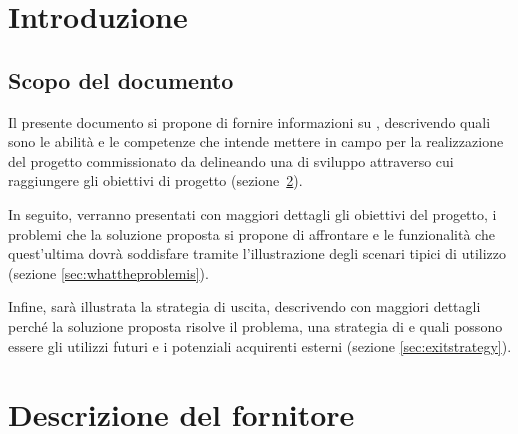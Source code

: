 \newcommand{\sharedPath}{../shared}
\newcommand{\doctitle}{Business Plan}








\section{Introduzione}

\subsection{Scopo del documento}
Il presente documento si propone di fornire informazioni su \team, descrivendo quali sono le abilità e le competenze che intende mettere in campo per la realizzazione del progetto commissionato da \customer delineando una  di sviluppo attraverso cui raggiungere gli obiettivi di progetto (sezione~\ref{sec:whoweare}).

 In seguito, verranno presentati con maggiori dettagli gli obiettivi del progetto, i problemi che la soluzione proposta si propone di affrontare e le funzionalità che quest'ultima dovrà soddisfare tramite l'illustrazione degli scenari tipici di utilizzo (sezione \ref{sec:whattheproblemis}).
 
Infine, sarà illustrata la strategia di uscita, descrivendo con maggiori dettagli perché la soluzione proposta risolve il problema, una strategia di \mktg e quali possono essere gli utilizzi futuri e i potenziali acquirenti esterni (sezione \ref{sec:exitstrategy}).

\section{Descrizione del fornitore}\label{sec:whoweare}

